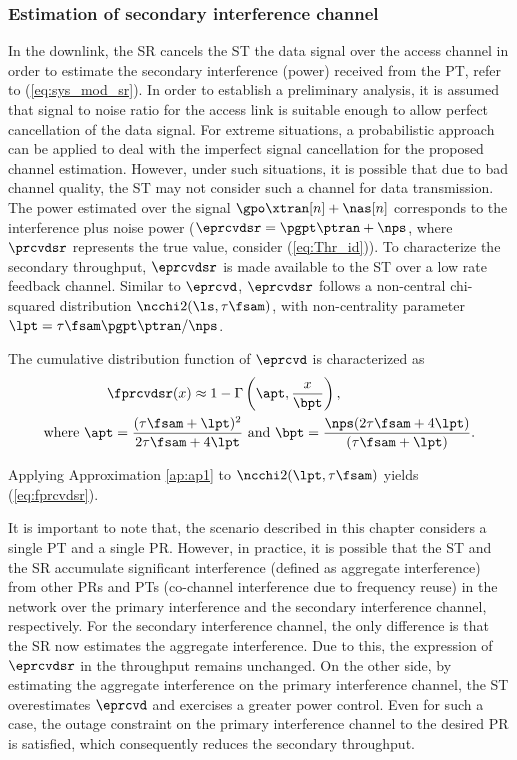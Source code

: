 \subsubsection{Estimation of secondary interference channel}
In the downlink, the SR cancels the ST the data signal over the access channel in order to estimate the secondary interference (power) received from the PT, refer to (\ref{eq:sys_mod_sr}). In order to establish a preliminary analysis, it is assumed that signal to noise ratio for the access link is suitable enough to allow perfect cancellation of the data signal. For extreme situations, a probabilistic approach can be applied to deal with the imperfect signal cancellation for the proposed channel estimation. However, under such situations, it is possible that due to bad channel quality, the ST may not consider such a channel for data transmission. The power estimated over the signal $\gpo \xtran[n] + \nas[n]$ corresponds to the interference plus noise power ($\eprcvdsr = \pgpt \ptran + \nps$, where $\prcvdsr$ represents the true value, consider (\ref{eq:Thr_id})). To characterize the secondary throughput, $\eprcvdsr$ is made available to the ST over a low rate feedback channel. Similar to $\eprcvd$, $\eprcvdsr$ follows a non-central chi-squared distribution $\ncchi2(\ls, \tau \fsam)$, with non-centrality parameter $\lpt = \tau \fsam \pgpt \ptran / \nps$.
\begin{lemma} \label{lm:lm3}
\normalfont
The cumulative distribution function of $\eprcvd$ is characterized as 
\begin{align}
\fprcvdsr(x) \approx 1 - \Gamma&\left(\apt, \frac{x}{\bpt}\right) \label{eq:fprcvdsr}, \\ 
\text{where  } \apt = \frac{(\tau \fsam + \lpt)^2}{2 \tau \fsam + 4 \lpt} &\text{ and } \bpt = \frac{\nps (2 \tau \fsam + 4 \lpt)}{(\tau \fsam + \lpt)}.  \label{eq:para_pt} 
\end{align} 
\end{lemma}
\begin{IEEEproof}
Applying Approximation \ref{ap:ap1} to $\ncchi2(\lpt, \tau \fsam)$ yields (\ref{eq:fprcvdsr}). 
\end{IEEEproof}
\begin{remark}
\normalfont
It is important to note that, the scenario described in this chapter considers a single PT and a single PR. However, in practice, it is possible that the ST and the SR accumulate significant interference (defined as aggregate interference) from other PRs and PTs (co-channel interference due to frequency reuse) in the network\cite{Elsawy13_cmag,Kaushik14_P} over the primary interference and the secondary interference channel, respectively. For the secondary interference channel, the only difference is that the SR now estimates the aggregate interference. Due to this, the expression of $\eprcvdsr$ in the throughput remains unchanged. On the other side, by estimating the aggregate interference on the primary interference channel, the ST overestimates $\eprcvd$ and exercises a greater power control. Even for such a case, the outage constraint on the primary interference channel to the desired PR is satisfied, which consequently reduces the secondary throughput.  
\end{remark}

